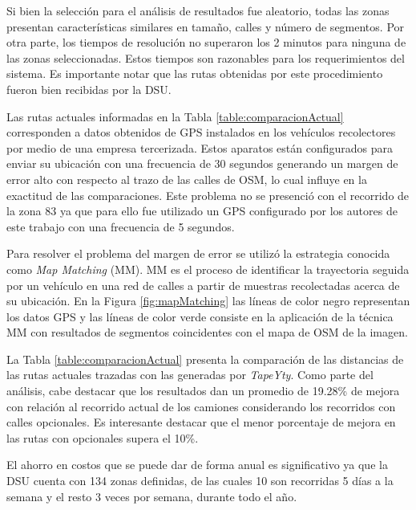 Si bien la selección para el análisis de resultados fue aleatorio, todas las zonas presentan características similares en tamaño, calles y número de segmentos. Por otra parte, los tiempos de resolución no superaron los 2 minutos para ninguna de las zonas seleccionadas. Estos tiempos son razonables para los requerimientos del sistema. Es importante notar que las rutas obtenidas por este procedimiento fueron bien recibidas por la DSU.

Las rutas actuales informadas en la Tabla \ref{table:comparacionActual} corresponden a datos obtenidos de GPS instalados en los vehículos recolectores por medio de una empresa tercerizada. Estos aparatos están configurados para enviar su ubicación con una frecuencia de 30 segundos generando un margen de error alto con respecto al trazo de las calles de OSM, lo cual influye en la exactitud de las comparaciones. Este problema no se presenció con el recorrido de la zona 83 ya que para ello fue utilizado un GPS configurado por los autores de este trabajo con una frecuencia de 5 segundos.

Para resolver el problema del margen de error se utilizó la estrategia conocida como \textit{Map Matching} (MM). MM es el proceso de identificar la trayectoria seguida por un vehículo en una red de calles a partir de muestras recolectadas acerca de su ubicación. En la Figura \ref{fig:mapMatching} las líneas de color negro representan los datos GPS y las líneas de color verde consiste en la aplicación de la técnica MM con resultados de segmentos coincidentes con el mapa de OSM de la imagen.

La Tabla \ref{table:comparacionActual} presenta la comparación de las distancias de las rutas actuales trazadas con las generadas por \textit{TapeYty}. Como parte del análisis, cabe destacar que los resultados dan un promedio de 19.28\% de mejora con relación al recorrido actual de los camiones considerando los recorridos con calles opcionales. Es interesante destacar que el menor porcentaje de mejora en las rutas con opcionales supera el 10\%.

El ahorro en costos que se puede dar de forma anual es significativo ya que la DSU cuenta con 134 zonas definidas, de las cuales 10 son recorridas 5 días a la semana y el resto 3 veces por semana, durante todo el año. 

